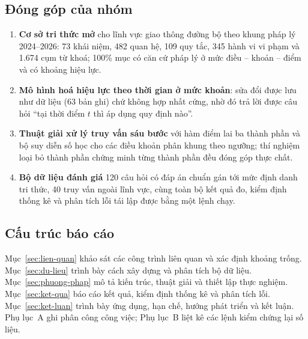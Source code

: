 \subsection{Đóng góp của nhóm}

\begin{enumerate}
  \item \textbf{Cơ sở tri thức mở} cho lĩnh vực giao thông đường bộ theo khung pháp lý
        2024--2026: 73 khái niệm, 482 quan hệ, 109 quy tắc, 345 hành vi vi phạm và 1.674
        cụm từ khoá; 100\% mục có căn cứ pháp lý ở mức điều -- khoản -- điểm và có khoảng
        hiệu lực.
  \item \textbf{Mô hình hoá hiệu lực theo thời gian ở mức khoản}: sửa đổi được lưu như dữ
        liệu (63 bản ghi) chứ không hợp nhất cứng, nhờ đó trả lời được câu hỏi ``tại thời
        điểm $t$ thì áp dụng quy định nào''.
  \item \textbf{Thuật giải xử lý truy vấn sáu bước} với hàm điểm lai ba thành phần và bộ
        suy diễn số học cho các điều khoản phân khung theo ngưỡng; thí nghiệm loại bỏ thành
        phần chứng minh từng thành phần đều đóng góp thực chất.
  \item \textbf{Bộ dữ liệu đánh giá} 120 câu hỏi có đáp án chuẩn gán tới mức định danh tri
        thức, 40 truy vấn ngoài lĩnh vực, cùng toàn bộ kết quả đo, kiểm định thống kê và
        phân tích lỗi tái lập được bằng một lệnh chạy.
\end{enumerate}

\subsection{Cấu trúc báo cáo}

Mục~\ref{sec:lien-quan} khảo sát các công trình liên quan và xác định khoảng trống.
Mục~\ref{sec:du-lieu} trình bày cách xây dựng và phân tích bộ dữ liệu.
Mục~\ref{sec:phuong-phap} mô tả kiến trúc, thuật giải và thiết lập thực nghiệm.
Mục~\ref{sec:ket-qua} báo cáo kết quả, kiểm định thống kê và phân tích lỗi.
Mục~\ref{sec:ket-luan} trình bày ứng dụng, hạn chế, hướng phát triển và kết luận.
Phụ lục~A ghi phân công công việc; Phụ lục~B liệt kê các lệnh kiểm chứng lại số liệu.
